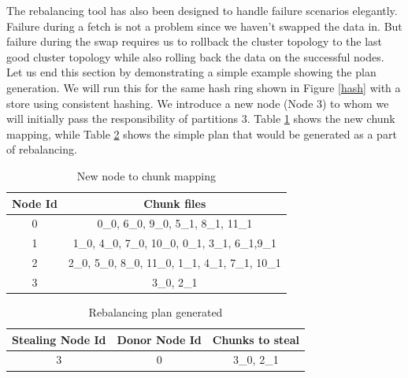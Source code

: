 \documentclass[twocolumn]{article}
\begin{document}
The rebalancing tool has also been designed to handle failure scenarios elegantly. Failure during a fetch is not a problem since we haven't swapped the data in. But failure during the swap requires us to rollback the cluster topology to the last good cluster topology while also rolling back the data on the successful nodes. Let us end this section by demonstrating a simple example showing the plan generation. We will run this for the same hash ring shown in Figure \ref{hash} with a store using consistent hashing. We introduce a new node (Node 3) to whom we will initially pass the responsibility of partitions 3. Table \ref{tab:new_node_to_chunk} shows the new chunk mapping, while Table \ref{tab:rebalance_plan} shows the simple plan that would be generated as a part of rebalancing. 

\begin{table}
\begin{center}
    \begin{tabular}{ | c | c | }
    \hline
    Node Id & Chunk files \\ \hline
    0 &  	0\_0, 6\_0, 9\_0,      			5\_1, 8\_1, 11\_1 			\\
   	1 &   	1\_0, 4\_0, 7\_0, 10\_0,      	0\_1, 3\_1, 6\_1,9\_1  		\\
   	2 &    	2\_0, 5\_0, 8\_0, 11\_0,    	1\_1, 4\_1, 7\_1, 10\_1		\\
   	3 &   	3\_0,                         	2\_1 						\\
\hline
    \end{tabular}
\end{center}
 	\caption{New node to chunk mapping}
 	\label{tab:new_node_to_chunk}
\end{table}

\begin{table}
\begin{center}
    \begin{tabular}{ | c | c | c | }
    \hline
    Stealing Node Id & Donor Node Id & Chunks to steal \\ \hline
    3 &  0 & 3\_0, 2\_1	\\
\hline
    \end{tabular}
\end{center}
\caption{Rebalancing plan generated}
\label{tab:rebalance_plan}
\end{table}



\end{document}
